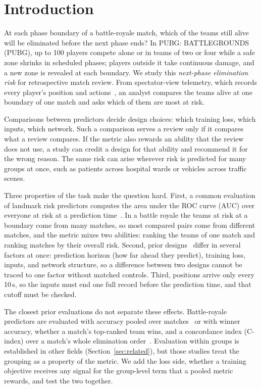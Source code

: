\documentclass[sigconf,anonymous]{acmart}
\begin{document}
\section{Introduction}
\label{sec:introduction}
At each phase boundary of a battle-royale match, which of the teams still alive will be eliminated before the next phase ends? In PUBG: BATTLEGROUNDS (PUBG), up to 100 players compete alone or in teams of two or four while a safe zone shrinks in scheduled phases; players outside it take continuous damage, and a new zone is revealed at each boundary. We study this \emph{next-phase elimination risk} for retrospective match review. From spectator-view telemetry, which records every player's position and actions~\cite{PUBGAPI}, an analyst compares the teams alive at one boundary of one match and asks which of them are most at risk.

Comparisons between predictors decide design choices: which training loss, which inputs, which network. Such a comparison serves a review only if it compares what a review compares. If the metric also rewards an ability that the review does not use, a study can credit a design for that ability and recommend it for the wrong reason. The same risk can arise wherever risk is predicted for many groups at once, such as patients across hospital wards or vehicles across traffic scenes.

Three properties of the task make the question hard. First, a common evaluation of landmark risk predictors computes the area under the ROC curve (AUC) over everyone at risk at a prediction time~\cite{vanHouwelingen07,HeagertyZheng05}. In a battle royale the teams at risk at a boundary come from many matches, so most compared pairs come from different matches, and the metric mixes two abilities: ranking the teams of one match and ranking matches by their overall risk. Second, prior designs~\cite{Sagong25a,KRAFTON} differ in several factors at once: prediction horizon (how far ahead they predict), training loss, inputs, and network structure, so a difference between two designs cannot be traced to one factor without matched controls. Third, positions arrive only every 10\,s, so the inputs must end one full record before the prediction time, and that cutoff must be checked.

The closest prior evaluations do not separate these effects. Battle-royale predictors are evaluated with accuracy pooled over matches~\cite{Sagong25a} or with winner accuracy, whether a match's top-ranked team wins, and a concordance index (C-index) over a match's whole elimination order~\cite{KRAFTON}. Evaluation within groups is established in other fields (Section~\ref{sec:related}), but those studies treat the grouping as a property of the metric. We add the loss side, whether a training objective receives any signal for the group-level term that a pooled metric rewards, and test the two together.
\end{document}
